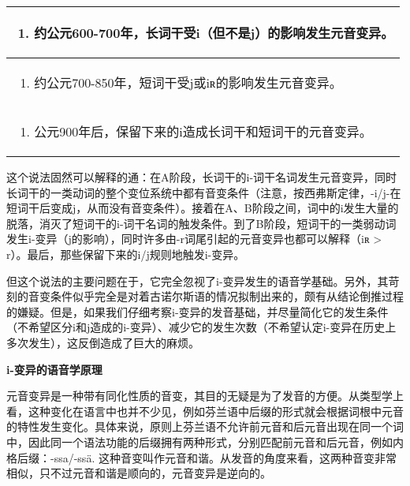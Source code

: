{{\begin{longtable}{l}
  \toprule
  \begin{enumerate}\def\labelenumi{\Alph{enumi}.}\item  约公元600-700年，长词干受i（但不是j）的影响发生元音变异。\end{enumerate} \\
  \midrule
  \endhead
  \bottomrule
  \endfoot
  \begin{minipage}[t]{\linewidth}\raggedright
    \begin{enumerate}
      \def\labelenumi{\Alph{enumi}.}
      \setcounter{enumi}{1}
      \item
            约公元700-850年，短词干受j或iʀ的影响发生元音变异。
    \end{enumerate}
  \end{minipage}                                                                                                \\
  \begin{minipage}[t]{\linewidth}\raggedright
    \begin{enumerate}
      \def\labelenumi{\Alph{enumi}.}
      \setcounter{enumi}{2}
      \item
            公元900年后，保留下来的i造成长词干和短词干的元音变异。
    \end{enumerate}
  \end{minipage}                                                                                                \\
\end{longtable}

这个说法固然可以解释的通：在A阶段，长词干的i-词干名词发生元音变异，同时长词干的一类动词的整个变位系统中都有音变条件（注意，按西弗斯定律，-i/j-在短词干后变成j，从而没有音变条件）。接着在A、B阶段之间，词中的i发生大量的脱落，消灭了短词干的i-词干名词的触发条件。到了B阶段，短词干的一类弱动词发生i-变异（j的影响），同时许多由-r词尾引起的元音变异也都可以解释（iʀ
\textgreater{} r）。最后，那些保留下来的i/j规则地触发i-变异。

但这个说法的主要问题在于，它完全忽视了i-变异发生的语音学基础。另外，其苛刻的音变条件似乎完全是对着古诺尔斯语的情况拟制出来的，颇有从结论倒推过程的嫌疑。但是，如果我们仔细考察i-变异的发音基础，并尽量简化它的发生条件（不希望区分i和j造成的i-变异）、减少它的发生次数（不希望认定i-变异在历史上多次发生），这反倒造成了巨大的麻烦。

\textbf{i-变异的语音学原理}

元音变异是一种带有同化性质的音变，其目的无疑是为了发音的方便。从类型学上看，这种变化在语言中也并不少见，例如芬兰语中后缀的形式就会根据词根中元音的特性发生变化。具体来说，原则上芬兰语不允许前元音和后元音出现在同一个词中，因此同一个语法功能的后缀拥有两种形式，分别匹配前元音和后元音，例如内格后缀：-ssa/-ssä.
这种音变叫作元音和谐。从发音的角度来看，这两种音变非常相似，只不过元音和谐是顺向的，元音变异是逆向的。

}}
